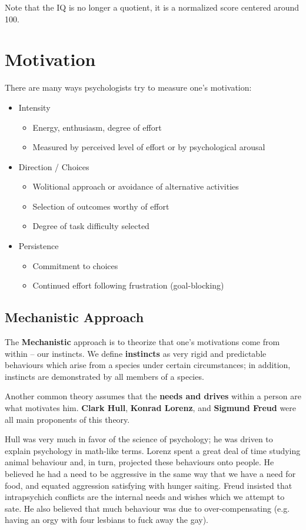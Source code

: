 \documentclass[12pt]{article}
\begin{document}
Note that the IQ is no longer a quotient, it is a normalized score centered around 100.

\section*{Motivation}
There are many ways psychologists try to measure one's motivation:
\begin{itemize}
\item Intensity
\begin{itemize}
\item Energy, enthusiasm, degree of effort
\item Measured by perceived level of effort or by psychological arousal
\end{itemize}
\item Direction / Choices
\begin{itemize}
\item Wolitional approach or avoidance of alternative activities
\item Selection of outcomes worthy of effort
\item Degree of task difficulty selected
\end{itemize}
\item Persistence
\begin{itemize}
\item Commitment to choices
\item Continued effort following frustration (goal-blocking)
\end{itemize}
\end{itemize}

\subsection*{Mechanistic Approach}
The {\bf Mechanistic} approach is to theorize that one's motivations come from within -- our instincts. We define {\bf instincts} as very rigid and predictable behaviours which arise from a species under certain circumstances; in addition, instincts are demonstrated by all members of a species.

Another common theory assumes that the {\bf needs and drives} within a person are what motivates him. {\bf Clark Hull}, {\bf Konrad Lorenz}, and {\bf Sigmund Freud} were all main proponents of this theory.

Hull was very much in favor of the science of psychology; he was driven to explain psychology in math-like terms. Lorenz spent a great deal of time studying animal behaviour and, in turn, projected these behaviours onto people. He believed he had a need to be aggressive in the same way that we have a need for food, and equated aggression satisfying with hunger saiting. Freud insisted that intrapsychich conflicts are the internal needs and wishes which we attempt to sate. He also believed that much behaviour was due to over-compensating (e.g. having an orgy with four lesbians to fuck away the gay).
\end{document}
